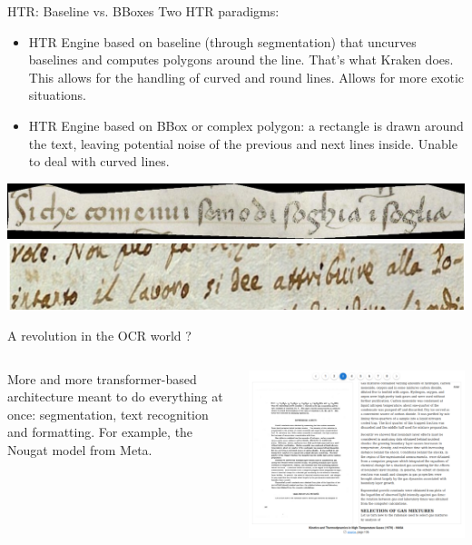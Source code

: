 \documentclass[aspectratio=169]{beamer}
\begin{document}
\begin{frame}{HTR: Baseline vs. BBoxes}
    Two HTR paradigms:
    \begin{itemize}
        \item HTR Engine based on baseline (through segmentation) that uncurves baselines and computes polygons around the line. That's what Kraken does. This allows for the handling of curved and round lines. Allows for more exotic situations.
        \item HTR Engine based on BBox or complex polygon: a rectangle is drawn around the text, leaving potential noise of the previous and next lines inside. Unable to deal with curved lines.
    \end{itemize}
    \includegraphics[width=.4\linewidth]{cv-for-ch/images/htr-polygons.jpg}\hfill
    \includegraphics[width=.4\linewidth]{cv-for-ch/images/htr-bbox.png}
\end{frame}

\begin{frame}{A revolution in the OCR world ?}
    \begin{columns}
        \begin{column}{.4\linewidth}
            More and more transformer-based architecture meant to do everything at once: segmentation, text recognition and formatting. For example, the Nougat model from Meta.
        \end{column}
        \begin{column}{.6\linewidth}
            \vspace{.3em}
            \includegraphics[width=\linewidth]{cv-for-ch/images/htr-nougat.png}
        \end{column}
    \end{columns}
    \centering
\end{frame}
\end{document}

